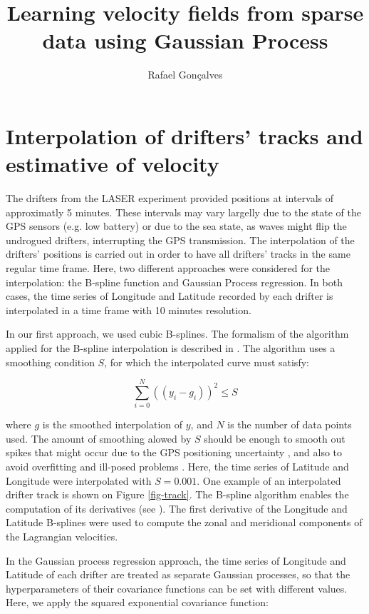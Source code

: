 \documentclass[12pt,a4paper]{article}%
\title{Learning velocity fields from sparse data using Gaussian Process}
\author{Rafael Gon\c{c}alves}
\begin{document}
\section{Interpolation of drifters' tracks and estimative of velocity}

The drifters from the LASER experiment provided positions at intervals of approximatly 5 minutes. 
These intervals may vary largelly due to the state of the GPS sensors (e.g. low battery) or due to 
the sea state, as waves might flip the undrogued drifters, interrupting the GPS transmission.
The interpolation of the drifters' positions is carried out in order to have all drifters' tracks in 
the same regular time frame. Here, two different approaches were considered for the interpolation: the 
B-spline function and Gaussian Process regression. In both cases, the time series of Longitude and Latitude 
recorded by each drifter is interpolated in a time frame with 10 minutes resolution.

In our first approach, we used cubic B-splines. The formalism of the algorithm applied for the B-spline 
interpolation is described in \cite{Dierckx1975,Dierckx1981,Dierckx1982,Dierckx1993}. The algorithm uses a 
smoothing condition $S$, for which the interpolated curve must satisfy:

\begin{equation}
 \sum_{i=0}^N((y_i - g_i))^2 \le S
\end{equation}

where $g$ is the smoothed interpolation of $y$, and $N$ is the number of data points used. 
The amount of smoothing alowed by $S$ should be enough to smooth out spikes that might occur 
due to the GPS positioning uncertainty \citep{Haza20?}, and also to avoid overfitting and ill-posed 
problems \citep{Dierckx1981}. Here, the time series of Latitude and Longitude were 
interpolated with $S=0.001$. One example of an interpolated drifter track is shown on Figure \ref{fig-track}.
The B-spline algorithm enables the computation of its derivatives (see \cite{Dierckx1975}). 
The first derivative of the Longitude and Latitude B-splines were used to compute the zonal and meridional 
components of the Lagrangian velocities.

In the Gaussian process regression approach, the time series of Longitude and Latitude of each drifter are 
treated as separate Gaussian processes, so that the hyperparameters of their covariance functions can 
be set with different values. Here, we apply the squared exponential covariance function:
\end{document}
